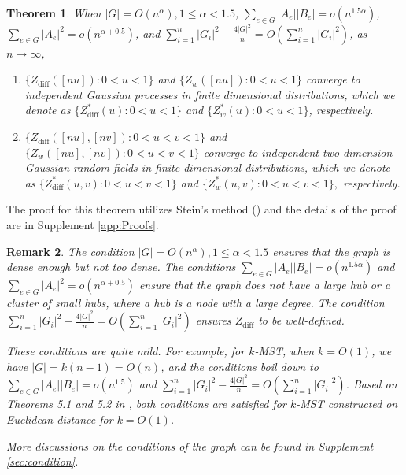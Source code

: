 \documentclass[arxiv, preprint]{imsart}
\numberwithin{equation}{section}
\theoremstyle{plain}
\newtheorem{thm}{Theorem}[section]
\newtheorem{remark}[thm]{Remark}
\begin{document}
\begin{thm}
\label{thm:GausProc}
When  $|G| = O(n^\alpha), 1 \le \alpha < 1.5$, $\sum_{e \in G} |A_e||B_e| = o(n^{1.5 \alpha})$, 
$\sum_{e \in G} |A_e|^2 = o(n^{\alpha+0.5})$, and $\sum_{i=1}^n |G_i|^2 - \tfrac{4|G|^2}{n} = O(\sum_{i=1}^n |G_i|^2)$, as $n \rightarrow \infty$,
\begin{enumerate}
\item $\{ Z_\text{diff}([nu]): 0< u <1\}$ and $\{Z_w([nu]):0<u<1 \}$ converge to independent Gaussian processes in finite dimensional distributions, which we denote as $\{Z_\text{diff}^*(u): 0 < u < 1\} $ and $\{Z_w^*(u):0 < u < 1\}$, respectively. 
\item $\{ Z_\text{diff}([nu],[nv]): 0< u < v< 1\}$ and $\{ Z_w([nu],[nv]): 0< u < v< 1\}$ converge to independent two-dimension Gaussian random fields in finite dimensional distributions, which we denote as $\{Z_\text{diff}^*(u,v): 0 < u < v<  1\}$ and $\{Z_w^*(u,v): 0 < u < v<  1\}, $ respectively. 
\end{enumerate}
\end{thm}

The proof for this theorem utilizes Stein's method (\cite{ChenShao2005}) and the details of the proof are in Supplement \ref{app:Proofs}.

\begin{remark}
The condition $|G| = O(n^\alpha), 1 \le \alpha < 1.5$ ensures that the graph is dense enough but not too dense. The conditions $\sum_{e \in G} |A_e||B_e| = o(n^{1.5 \alpha})$ and $\sum_{e \in G} |A_e|^2 = o(n^{\alpha+0.5})$ ensure that the graph does not have a large hub or a cluster of small hubs, where a hub is a node with a large degree. The condition $\sum_{i=1}^n |G_i|^2 - \tfrac{4|G|^2}{n} = O(\sum_{i=1}^n |G_i|^2)$ ensures $Z_\text{diff}$ to be well-defined. 

These conditions are quite mild. For example, 
for $k$-MST, when $k=O(1)$, we have $|G|=k(n-1) = O(n)$, and the conditions boil down to $\sum_{e \in G} |A_e||B_e| = o(n^{1.5})$ and $\sum_{i=1}^n |G_i|^2 - \tfrac{4|G|^2}{n} = O(\sum_{i=1}^n |G_i|^2)$.  Based on Theorems 5.1 and 5.2 in \cite{chen2017new}, both conditions are satisfied for $k$-MST constructed on Euclidean distance for $k=O(1)$.  %

More discussions on the conditions of the graph can be found in Supplement \ref{sec:condition}.

\end{remark}
\end{document}
